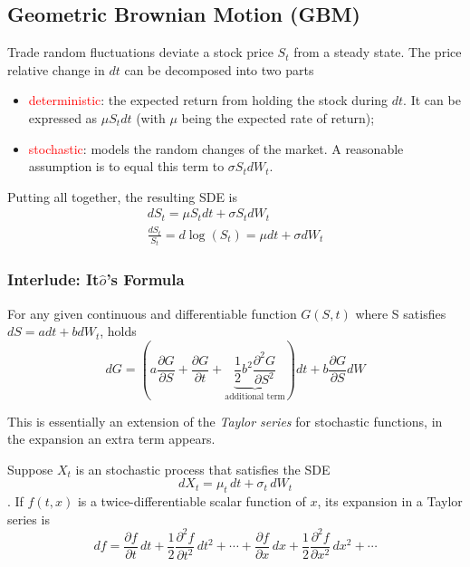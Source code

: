 \documentclass[12pt,a4paper]{book}
\begin{document}
\subsection{Geometric Brownian Motion (GBM)}
Trade random fluctuations deviate a stock price $S_t$ from a steady state.
The price relative change in $dt$ can be decomposed into two parts
\begin{itemize}
\item \textcolor{red}{deterministic}: the expected return from holding the stock during $dt$. It can be expressed as $\mu S_tdt$ (with $\mu$ being the expected rate of return);
\item \textcolor{red}{stochastic}: models the random changes of the market. A reasonable assumption is to equal this term to $\sigma S_t dW_t$. 
\end{itemize}

Putting all together, the resulting SDE is
\begin{equation}
\begin{gathered}
dS_t = \mu S_t dt + \sigma S_t dW_t \\
\frac{dS_t}{S_t} = d\log(S_t) = \mu dt + \sigma dW_t
\end{gathered}
\label{eq:log_normal_sde}
\end{equation}

\subsubsection{Interlude: It$\hat{o}$'s Formula}
For any given continuous and differentiable function $G(S,t)$ where S satisfies $dS=adt + bdW_t$, holds
\begin{equation}
dG = \left(a\frac{\partial G}{\partial S} + \frac{\partial G}{\partial t} + \underbrace{\frac{1}{2}b^2\frac{\partial^2 G}{\partial S^2}}_{\text{additional term}}\right)dt + b\frac{\partial G}{\partial S} dW
\label{eq:itos_lemma}
\end{equation}
			
This is essentially an extension of the \emph{Taylor series} for stochastic functions, in the expansion an extra term appears.	

Suppose $X_t$ is an stochastic process that satisfies the SDE
\begin{equation*}	
dX_{t}=\mu _{t}\,dt+\sigma _{t}\,dW_{t}
\end{equation*}.
If $f(t,x)$ is a twice-differentiable scalar function of $x$, its expansion in a Taylor series is
\begin{equation*}
df={\frac {\partial f}{\partial t}}\,dt+{\frac {1}{2}}{\frac {\partial ^{2}f}{\partial t^{2}}}\,dt^{2}+\cdots +{\frac {\partial f}{\partial x}}\,dx+{\frac {1}{2}}{\frac {\partial ^{2}f}{\partial x^{2}}}\,dx^{2}+\cdots
\end{equation*}
\end{document}
